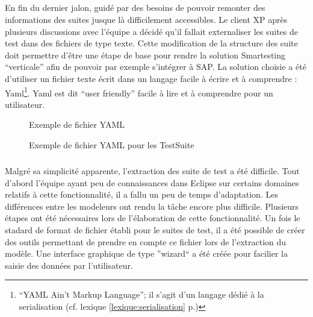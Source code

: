 \subparagraph*{}
En fin du dernier jalon, guidé par des besoins de pouvoir remonter des informations des suites jusque là difficilement accessibles. Le client XP après plusieurs discussions avec l'équipe a décidé qu'il fallait externaliser les suites de test dans des fichiers de type texte. Cette modification de la structure des suite doit permettre d'être une étape de base pour rendre la solution Smartesting ``verticale'' afin de pouvoir par exemple s'intégrer à SAP. La solution choisie a été d'utiliser un fichier texte écrit dans un langage facile à écrire et à comprendre : Yaml\footnote{``YAML Ain't Markup Language''; il s'agit d'un langage dédié à la serialisation (cf. lexique \ref{lexique:serialisation} p.\pageref{lexique:serialisation})}. Yaml est dit ``user friendly'' facile à lire et à comprendre pour un utilisateur.

\begin{figure}[!ht]
\centering
{}
\caption{Exemple de fichier YAML}
\label{figure:exYaml}
\end{figure}

\begin{figure}[!ht]
\centering
{}
\caption{Exemple de fichier YAML pour les TestSuite}
\label{figure:exTestSuite}
\end{figure}   

\subparagraph*{}
Malgré sa simplicité apparente, l'extraction des suite de test a été difficile. Tout d'abord l'équipe ayant peu de connaissances dans Eclipse sur certains domaines relatifs à cette fonctionnalité, il a fallu un peu de temps d'adaptation. Les différences entre les modeleurs ont rendu la tâche encore plus difficile. Plusieurs étapes ont été nécessaires lors de l'élaboration de cette fonctionnalité. Un fois le stadard de format de fichier établi pour le suites de test, il a été possible de créer des outils permettant de prendre en compte ce fichier lors de l'extraction du modèle. Une interface graphique de type ''wizard`` a été créée pour facilier la saisie des données par l'utilisateur.

